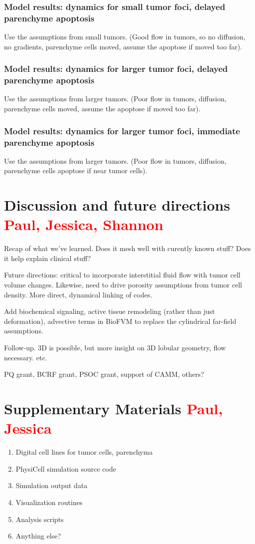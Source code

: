 \documentclass[smallextended,natbib]{svjour3}
\newcommand{\red}[1]{\textcolor{red}{#1}}
\begin{document}
\subsubsection{Model results: dynamics for small tumor foci, delayed parenchyme apoptosis} 
Use the assumptions from small tumors. (Good flow in tumors, so no diffusion, no gradients, parenchyme cells moved, 
assume the apoptose if moved too far). 

\subsubsection{Model results: dynamics for larger tumor foci, delayed parenchyme apoptosis} 
Use the assumptions from larger tumors. (Poor flow in tumors, diffusion, parenchyme cells moved, 
assume the apoptose if moved too far). 

\subsubsection{Model results: dynamics for larger tumor foci, immediate parenchyme apoptosis} 
Use the assumptions from larger tumors. (Poor flow in tumors, diffusion, parenchyme cells apoptose if near tumor cells). 





\section{Discussion and future directions \red{Paul, Jessica, Shannon}}
Recap of what we've learned. Does it mesh well with curently known stuff? Does it help explain clinical stuff? 

Future directions: critical to incorporate interstitial fluid flow with tumor cell volume changes. Likewise, need to drive porosity assumptions 
from tumor cell density. More direct, dynamical linking of codes. 

Add biochemical signaling, active tissue remodeling (rather than just deformation), advective terms in BioFVM to replace 
the cylindrical far-field assumptions. 

Follow-up. 3D is possible, but more insight on 3D lobular geometry, flow necessary. etc. 


\begin{acknowledgements}
PQ grant, BCRF grant, PSOC grant, support of CAMM, others?
\end{acknowledgements}

\section{Supplementary Materials \red{Paul, Jessica}}
\begin{enumerate}
\item 
Digital cell lines for tumor cells, parenchyma 
\item 
PhysiCell simulation source code
\item 
Simulation output data
\item 
Visualization routines 
\item 
Analysis scripts 
\item 
Anything else? 
\end{enumerate}


\end{document}

